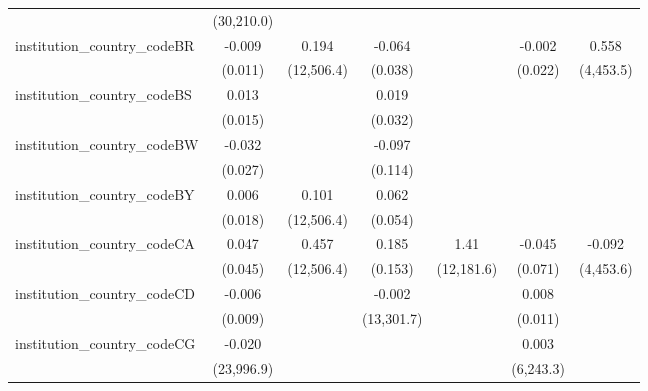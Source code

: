 \begin{tabular}{lcccccc}
                                         & (30,210.0)     &               &               &               &               &   \\   
   institution\_country\_codeBR          & -0.009         & 0.194         & -0.064        &               & -0.002        & 0.558\\   
                                         & (0.011)        & (12,506.4)    & (0.038)       &               & (0.022)       & (4,453.5)\\   
   institution\_country\_codeBS          & 0.013          &               & 0.019         &               &               &   \\   
                                         & (0.015)        &               & (0.032)       &               &               &   \\   
   institution\_country\_codeBW          & -0.032         &               & -0.097        &               &               &   \\   
                                         & (0.027)        &               & (0.114)       &               &               &   \\   
   institution\_country\_codeBY          & 0.006          & 0.101         & 0.062         &               &               &   \\   
                                         & (0.018)        & (12,506.4)    & (0.054)       &               &               &   \\   
   institution\_country\_codeCA          & 0.047          & 0.457         & 0.185         & 1.41          & -0.045        & -0.092\\   
                                         & (0.045)        & (12,506.4)    & (0.153)       & (12,181.6)    & (0.071)       & (4,453.6)\\   
   institution\_country\_codeCD          & -0.006         &               & -0.002        &               & 0.008         &   \\   
                                         & (0.009)        &               & (13,301.7)    &               & (0.011)       &   \\   
   institution\_country\_codeCG          & -0.020         &               &               &               & 0.003         &   \\   
                                         & (23,996.9)     &               &               &               & (6,243.3)     &   \\   

\end{tabular}
